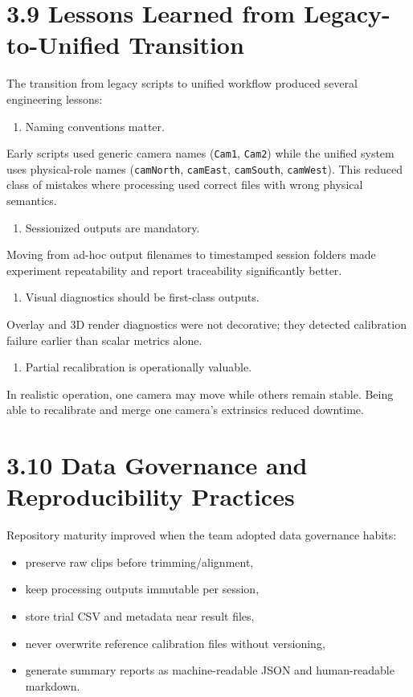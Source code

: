 \section{3.9 Lessons Learned from Legacy-to-Unified Transition}
The transition from legacy scripts to unified workflow produced several engineering lessons:

\begin{enumerate}
  \item Naming conventions matter.
\end{enumerate}
   Early scripts used generic camera names (\texttt{Cam1}, \texttt{Cam2}) while the unified system uses physical-role names (\texttt{camNorth}, \texttt{camEast}, \texttt{camSouth}, \texttt{camWest}). This reduced class of mistakes where processing used correct files with wrong physical semantics.

\begin{enumerate}
  \item Sessionized outputs are mandatory.
\end{enumerate}
   Moving from ad-hoc output filenames to timestamped session folders made experiment repeatability and report traceability significantly better.

\begin{enumerate}
  \item Visual diagnostics should be first-class outputs.
\end{enumerate}
   Overlay and 3D render diagnostics were not decorative; they detected calibration failure earlier than scalar metrics alone.

\begin{enumerate}
  \item Partial recalibration is operationally valuable.
\end{enumerate}
   In realistic operation, one camera may move while others remain stable. Being able to recalibrate and merge one camera's extrinsics reduced downtime.

\section{3.10 Data Governance and Reproducibility Practices}
Repository maturity improved when the team adopted data governance habits:
\begin{itemize}
  \item preserve raw clips before trimming/alignment,
  \item keep processing outputs immutable per session,
  \item store trial CSV and metadata near result files,
  \item never overwrite reference calibration files without versioning,
  \item generate summary reports as machine-readable JSON and human-readable markdown.
\end{itemize}

